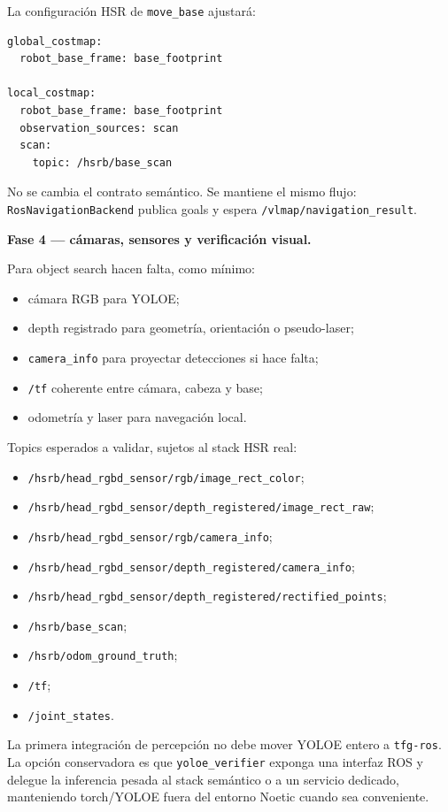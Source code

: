 \documentclass[11pt,a4paper]{article}
\begin{document}
La configuración HSR de \texttt{move\_base} ajustará:

\begin{verbatim}
global_costmap:
  robot_base_frame: base_footprint

local_costmap:
  robot_base_frame: base_footprint
  observation_sources: scan
  scan:
    topic: /hsrb/base_scan
\end{verbatim}

No se cambia el contrato semántico. Se mantiene el mismo flujo:
\texttt{RosNavigationBackend} publica goals y espera
\texttt{/vlmap/navigation\_result}.

\textbf{Fase 4 --- cámaras, sensores y verificación visual.}

Para object search hacen falta, como mínimo:

\begin{itemize}
  \item cámara RGB para YOLOE;
  \item depth registrado para geometría, orientación o pseudo-laser;
  \item \texttt{camera\_info} para proyectar detecciones si hace falta;
  \item \texttt{/tf} coherente entre cámara, cabeza y base;
  \item odometría y laser para navegación local.
\end{itemize}

Topics esperados a validar, sujetos al stack HSR real:

\begin{itemize}
  \item \texttt{/hsrb/head\_rgbd\_sensor/rgb/image\_rect\_color};
  \item \texttt{/hsrb/head\_rgbd\_sensor/depth\_registered/image\_rect\_raw};
  \item \texttt{/hsrb/head\_rgbd\_sensor/rgb/camera\_info};
  \item \texttt{/hsrb/head\_rgbd\_sensor/depth\_registered/camera\_info};
  \item \texttt{/hsrb/head\_rgbd\_sensor/depth\_registered/rectified\_points};
  \item \texttt{/hsrb/base\_scan};
  \item \texttt{/hsrb/odom\_ground\_truth};
  \item \texttt{/tf};
  \item \texttt{/joint\_states}.
\end{itemize}

La primera integración de percepción no debe mover YOLOE entero a
\texttt{tfg-ros}. La opción conservadora es que \texttt{yoloe\_verifier}
exponga una interfaz ROS y delegue la inferencia pesada al stack semántico o a
un servicio dedicado, manteniendo torch/YOLOE fuera del entorno Noetic cuando
sea conveniente.
\end{document}

